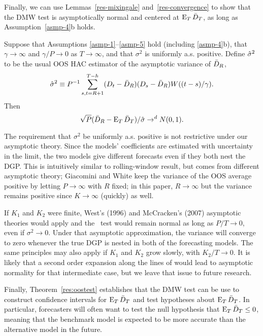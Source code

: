 Finally, we can use Lemmas~\ref{res-mixingale}
and~\ref{res-convergence} to show that the DMW test is asymptotically
normal and centered at $\operatorname{E}_T \bar{D}_{T}$, as long as
Assumption~\ref{asmp-4}b holds.

\begin{thm}\label{res-oost}
  Suppose that Assumptions \ref{asmp-1}--\ref{asmp-5} hold (including
  \ref{asmp-4}b), that $\gamma \to \infty$ and $\gamma/P \to 0$ as $T
  \to \infty$, and that $\sigma^2$ is uniformly a.s. positive. Define
  $\hat{\sigma}^2$ to be the usual OOS HAC estimator of the asymptotic variance
  of $\bar{D}_{R}$,
  \begin{equation}
    \hat{\sigma}^2 \equiv P^{-1} \sum_{s,t=R+1}^{T-h} (D_t - \bar{D}_{R})(D_s - \bar{D}_{R})
    W((t-s)/\gamma).
  \end{equation}
  Then
  \begin{equation}
    \sqrt{P}(\bar{D}_{R} - \operatorname{E}_T\bar{D}_{T})/\hat{\sigma} \to^d N(0,1).
  \end{equation}
\end{thm}

The requirement that $\sigma^2$ be uniformly a.s. positive is not
restrictive under our asymptotic theory. Since the models'
coefficients are estimated with uncertainty in the limit, the two
models give different forecasts even if they both nest the DGP.  This
is intuitively similar to  rolling-window result, but
comes from different asymptotic theory; Giacomini and White keep the
variance of the OOS average positive by letting $P \to \infty$ with
$R$ fixed; in this paper, $R \to \infty$ but the variance remains
positive since $K \to \infty$ (quickly) as well.

If $K_1$ and $K_2$ were finite, West's (1996) and McCracken's (2007)
asymptotic theories would apply and the \oost\ test would remain normal as long
as $P/T \to 0$, even if $\sigma^2 \to 0$. Under that asymptotic
approximation, the variance will converge to zero whenever the true
DGP is nested in both of the forecasting models. The same principles
may also apply if $K_1$ and $K_2$ grow slowly, with $K_2/T \to
0$. It is likely that a second order expansion along the lines of
\citet{Mcc:07} would lead to asymptotic normality for that
intermediate case, but we leave that issue to future research.

Finally, Theorem~\ref{res:oostest} establishes that the DMW test can be
use to construct confidence intervals for $\operatorname{E}_T \bar{D}_{T}$ and test
hypotheses about $\operatorname{E}_T \bar{D}_{T}$. In particular, forecasters will often
want to test the null hypothesis that $\operatorname{E}_T \bar{D}_{T} \leq 0$, meaning
that the benchmark model is expected to be more accurate than the
alternative model in the future.

